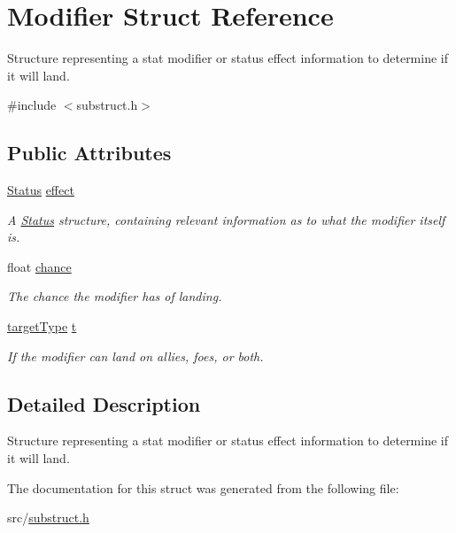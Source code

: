 \hypertarget{struct_modifier}{}\section{Modifier Struct Reference}
\label{struct_modifier}


Structure representing a stat modifier or status effect information to determine if it will land.  




{\ttfamily \#include $<$substruct.\+h$>$}

\subsection*{Public Attributes}
\begin{DoxyCompactItemize}
\item 
\mbox{\label{struct_modifier_ae3545ee6ad25f3916611e38cef8319f9}} 
\hyperlink{struct_status}{Status} \hyperlink{struct_modifier_ae3545ee6ad25f3916611e38cef8319f9}{effect}
\begin{DoxyCompactList}\small\item\em A \hyperlink{struct_status}{Status} structure, containing relevant information as to what the modifier itself is. \end{DoxyCompactList}\item 
\mbox{\label{struct_modifier_ae64995d87e4e17a0bfc1b08906fafe85}} 
float \hyperlink{struct_modifier_ae64995d87e4e17a0bfc1b08906fafe85}{chance}
\begin{DoxyCompactList}\small\item\em The chance the modifier has of landing. \end{DoxyCompactList}\item 
\mbox{\label{struct_modifier_ad7d7e6c4e9f0dc7b10c73957482b696f}} 
\hyperlink{substruct_8h_a02962753cb153ca273ca219aa4c33ba2}{target\+Type} \hyperlink{struct_modifier_ad7d7e6c4e9f0dc7b10c73957482b696f}{t}
\begin{DoxyCompactList}\small\item\em If the modifier can land on allies, foes, or both. \end{DoxyCompactList}\end{DoxyCompactItemize}


\subsection{Detailed Description}
Structure representing a stat modifier or status effect information to determine if it will land. 

The documentation for this struct was generated from the following file\+:\begin{DoxyCompactItemize}
\item 
src/\hyperlink{substruct_8h}{substruct.\+h}\end{DoxyCompactItemize}
